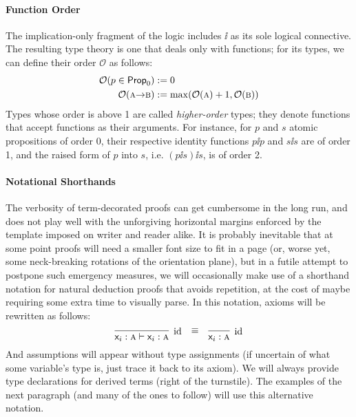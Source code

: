\paragraph{Function Order} The implication-only fragment of the logic includes $\ii$ as its sole logical connective.
The resulting type theory is one that deals only with functions; for its types, we can define their order $\mathcal{O}$ as follows:
\begin{equation}
	\begin{aligned}
	\mathcal{O}(p \in \propcon{}) & := 0 \\
	\mathcal{O}(\prop{a} \ii \prop{b}) & := \mathrm{max}(\mathcal{O}(\prop{a}) + 1, \mathcal{O}(\prop{b}))
	\end{aligned}
\end{equation}
Types whose order is above 1 are called \textit{higher-order} types; they denote functions that accept functions as their arguments.
For instance, for $p$ and $s$ atomic propositions of order 0, their respective identity functions $p\ii p$ and $s\ii s$ are of order 1, and the raised form of $p$ into $s$, i.e. $(p\ii s)\ii s$, is of order 2.

\paragraph{Notational Shorthands}
The verbosity of term-decorated proofs can get cumbersome in the long run, and does not play well with the unforgiving horizontal margins enforced by the template imposed on writer and reader alike.
It is probably inevitable that at some point proofs will need a smaller font size to fit in a page (or, worse yet, some neck-breaking rotations of the orientation plane), but in a futile attempt to postpone such emergency measures, we will occasionally make use of a shorthand notation for natural deduction proofs that avoids repetition, at the cost of maybe requiring some extra time to visually parse.
In this notation, axioms will be rewritten as follows:
\[
\infer[\Ax]{\term{\vari }: \prop{a} \vdash \term{\vari }: \prop{a}}{} \quad \raisebox{7pt}{$\equiv$} \quad \infer[\Ax]{\term{\vari }:\prop{a}}{}
\]
And assumptions will appear without type assignments (if uncertain of what some variable's type is, just trace it back to its axiom). 
We will always provide type declarations for derived terms (right of the turnstile).
The examples of the next paragraph (and many of the ones to follow) will use this alternative notation.

